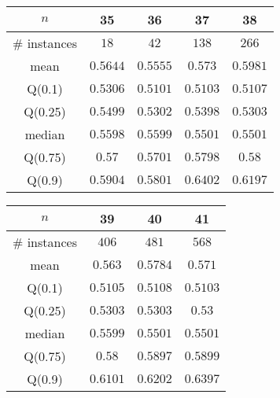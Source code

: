 \begin{tabular}{c|cccc} 
\hline 
$n$ & 35 & 36 & 37 & 38 \tabularnewline 
\hline 
\hline 
\# instances & $18$ & $42$ & $138$ & $266$ \tabularnewline 
mean & $0.5644$ & $0.5555$ & $0.573$ & $0.5981$ \tabularnewline 
Q(0.1) & $0.5306$ & $0.5101$ & $0.5103$ & $0.5107$ \tabularnewline 
Q(0.25) & $0.5499$ & $0.5302$ & $0.5398$ & $0.5303$ \tabularnewline 
median & $0.5598$ & $0.5599$ & $0.5501$ & $0.5501$ \tabularnewline 
Q(0.75) & $0.57$ & $0.5701$ & $0.5798$ & $0.58$ \tabularnewline 
Q(0.9) & $0.5904$ & $0.5801$ & $0.6402$ & $0.6197$ \tabularnewline 
\hline 
\end{tabular} 
\medskip{} 

\begin{tabular}{c|ccc} 
\hline 
$n$ & 39 & 40 & 41 \tabularnewline 
\hline 
\hline 
\# instances & $406$ & $481$ & $568$ \tabularnewline 
mean & $0.563$ & $0.5784$ & $0.571$ \tabularnewline 
Q(0.1) & $0.5105$ & $0.5108$ & $0.5103$ \tabularnewline 
Q(0.25) & $0.5303$ & $0.5303$ & $0.53$ \tabularnewline 
median & $0.5599$ & $0.5501$ & $0.5501$ \tabularnewline 
Q(0.75) & $0.58$ & $0.5897$ & $0.5899$ \tabularnewline 
Q(0.9) & $0.6101$ & $0.6202$ & $0.6397$ \tabularnewline 
\hline 
\end{tabular} 
\medskip{} 

